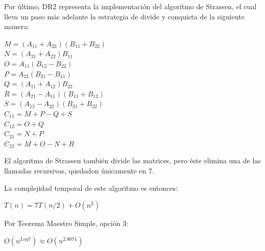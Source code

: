 \documentclass[12pt]{report}
\begin{document}
  Por último, DR2 representa la implementación del algoritmo de Strassen, el cual lleva un paso más adelante la estrategia de divide y conquista de la siguiente manera:
  
  \begin{center}
    $M = (A_{11} + A_{22})(B_{11} + B_{22})$ \\
    $N = (A_{21} + A_{22})B_{11}$ \\
    $O = A_{11}(B_{12} - B_{22})$ \\
    $P = A_{22}(B_{21} - B_{11})$ \\
    $Q = (A_{11} + A_{12})B_{22}$ \\
    $R = (A_{21} - A_{11})(B_{11} + B_{12})$\\
    $S = (A_{12} - A_{22})(B_{21} + B_{22})$ \\
    $C_{11} = M + P - Q + S$ \\
    $C_{12} = O + Q$ \\
    $C_{21} = N + P$ \\
    $C_{22} = M + O - N + R$
  \end{center}
  
  El algoritmo de Strassen también divide las matrices, pero éste elimina una de las llamadas recursivas, quedadon únicamente en 7.
  
  La complejidad temporal de este algoritmo es entonces:
  
  \begin{center}
      $T(n) = 7T(n/2) +  O(n^2)$
  \end{center}

  
  Por Teorema Maestro Simple, opción 3:
  
  \begin{center}
    $O(n^{Log7}) \approx O(n^{2.8074})$
  \end{center}
  
  \centering
\end{document}

